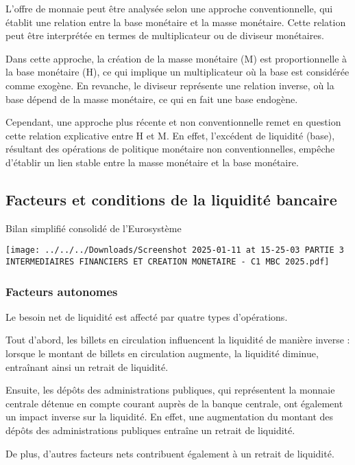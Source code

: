 \documentclass[a4paper, 12pt]{report}
\begin{document}
L'offre de monnaie peut être analysée selon une approche conventionnelle, qui établit une relation entre la base monétaire et la masse monétaire. Cette relation peut être interprétée en termes de multiplicateur ou de diviseur monétaires. 

Dans cette approche, la création de la masse monétaire (M) est proportionnelle à la base monétaire (H), ce qui implique un multiplicateur où la base est considérée comme exogène. En revanche, le diviseur représente une relation inverse, où la base dépend de la masse monétaire, ce qui en fait une base endogène.

Cependant, une approche plus récente et non conventionnelle remet en question cette relation explicative entre H et M. En effet, l'excédent de liquidité (base), résultant des opérations de politique monétaire non conventionnelles, empêche d'établir un lien stable entre la masse monétaire et la base monétaire.

\subsection{Facteurs et conditions de la liquidité bancaire}

Bilan simplifié consolidé de l'Eurosystème

\begin{center}
	\texttt{[image: ../../../Downloads/Screenshot 2025-01-11 at 15-25-03 PARTIE 3 INTERMEDIAIRES FINANCIERS ET CREATION MONETAIRE - C1 MBC 2025.pdf]}
\end{center}

\subsubsection{Facteurs autonomes}

Le besoin net de liquidité est affecté par quatre types d'opérations. 

Tout d'abord, les billets en circulation influencent la liquidité de manière inverse : lorsque le montant de billets en circulation augmente, la liquidité diminue, entraînant ainsi un retrait de liquidité. 

Ensuite, les dépôts des administrations publiques, qui représentent la monnaie centrale détenue en compte courant auprès de la banque centrale, ont également un impact inverse sur la liquidité. En effet, une augmentation du montant des dépôts des administrations publiques entraîne un retrait de liquidité.

De plus, d'autres facteurs nets contribuent également à un retrait de liquidité. 
\end{document}
